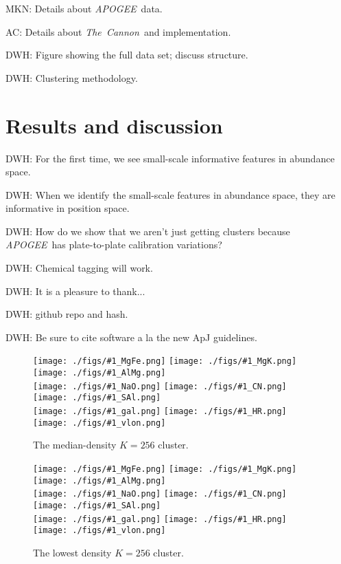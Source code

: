\documentclass[12pt, letterpaper, preprint]{aastex}
\newcommand{\acronym}[1]{{\small{#1}}}
\newcommand{\project}[1]{\textsl{#1}}
\newcommand{\apogee}{\acronym{\project{APOGEE}}}
\newcommand{\thecannon}{\project{The~Cannon}}
\newlength{\figwidth}\setlength{\figwidth}{0.3\textwidth}
\newcommand{\insanefigure}[1]{%
\texttt{[image: ./figs/\#1\_MgFe.png]}%
\texttt{[image: ./figs/\#1\_MgK.png]}%
\texttt{[image: ./figs/\#1\_AlMg.png]}\\
\texttt{[image: ./figs/\#1\_NaO.png]}%
\texttt{[image: ./figs/\#1\_CN.png]}%
\texttt{[image: ./figs/\#1\_SAl.png]}\\
\texttt{[image: ./figs/\#1\_gal.png]}%
\texttt{[image: ./figs/\#1\_HR.png]}\\
\texttt{[image: ./figs/\#1\_vlon.png]}}
\begin{document}
MKN: Details about \apogee\ data.

AC: Details about \thecannon\ and implementation.

DWH: Figure showing the full data set; discuss structure.

DWH: Clustering methodology.

\section{Results and discussion}

DWH: For the first time, we see small-scale informative features in abundance space.

DWH: When we identify the small-scale features in abundance space, they are informative in position space.

DWH: How do we show that we aren't just getting clusters because \apogee\ has plate-to-plate calibration variations?

DWH: Chemical tagging will work.

\acknowledgements
DWH: It is a pleasure to thank...

DWH: github repo and hash.

DWH: Be sure to cite software a la the new ApJ guidelines.

\begin{figure}[!p]
\insanefigure{noncluster_0256_0080}
\caption{The median-density $K=256$ cluster.\label{fig:median}}
\end{figure}
\begin{figure}[!p]
\insanefigure{noncluster_0256_0196}
\caption{The lowest density $K=256$ cluster.\label{fig:lowest}}
\end{figure}
\end{document}
